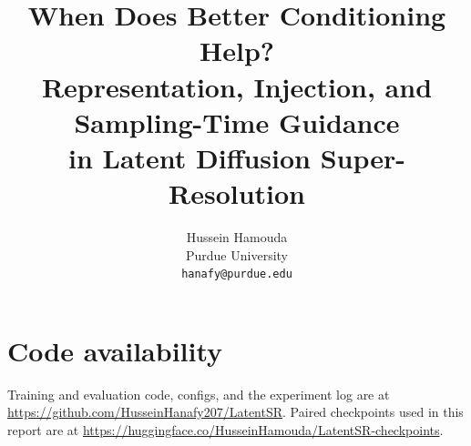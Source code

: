 \documentclass{article}
\title{When Does Better Conditioning Help?\\
Representation, Injection, and Sampling-Time Guidance\\
in Latent Diffusion Super-Resolution}
\author{%
  Hussein Hamouda \\
  Purdue University \\
  \texttt{hanafy@purdue.edu}
}
\begin{document}
\maketitle

\begin{abstract}

\end{abstract}








\section*{Code availability}
Training and evaluation code, configs, and the experiment log are at
\url{https://github.com/HusseinHanafy207/LatentSR}.
Paired checkpoints used in this report are at
\url{https://huggingface.co/HusseinHamouda/LatentSR-checkpoints}.


\end{document}
